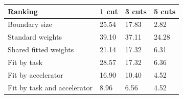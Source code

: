 \begin{tabular}{@{}llll@{}}
\toprule
Ranking & 1 cut & 3 cuts & 5 cuts \\
\midrule
Boundary size & 25.54 & 17.83 & 2.82 \\
Standard weights & 39.10 & 37.11 & 24.28 \\
Shared fitted weights & 21.14 & 17.32 & 6.31 \\
Fit by task & 28.57 & 17.32 & 6.36 \\
Fit by accelerator & 16.90 & 10.40 & 4.52 \\
Fit by task and accelerator & 8.96 & 6.56 & 4.52 \\
\bottomrule
\end{tabular}

